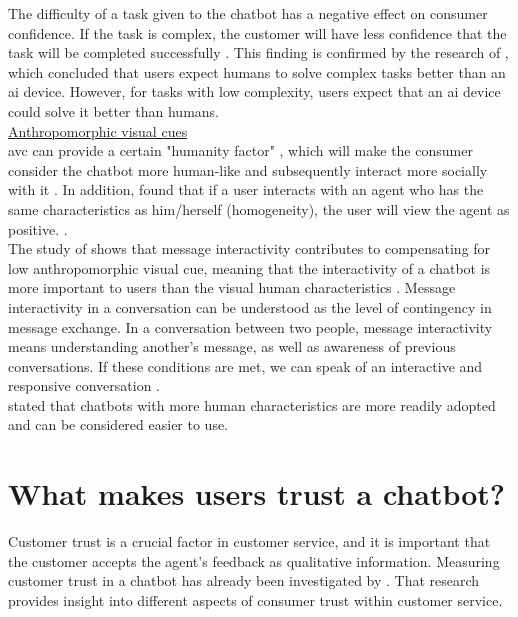 The difficulty of a task given to the chatbot has a negative effect on consumer confidence. If the task is complex, the customer will have less confidence that the task will be completed successfully \citep{Cheng2021}.
This finding is confirmed by the research of \citeauthor{XU2020}, which concluded that users expect humans to solve complex tasks better than an \acrshort{ai} device. However, for tasks with low complexity, users expect that an \acrshort{ai} device could solve it better than humans. \citep{XU2020}\\
\break
\ul{Anthropomorphic visual cues}\\
\gls{avc} can provide a certain "humanity factor" \citep{Shyam2008}, which will make the consumer consider the chatbot more human-like and subsequently interact more socially with it \citep{Go2019,Gong2007,Kim2012, Nowak2004}.
In addition, \citeauthor{Go2019,Koda1996,Wexelblat1998} found that if a user interacts with an agent who has the same characteristics as him/herself (homogeneity), the user will view the agent as positive. \citep{Go2019,Koda1996,Wexelblat1998}.\\
\break
The study of \citeauthor{Go2019} shows that message interactivity contributes to compensating for low anthropomorphic visual cue, meaning that the interactivity of a chatbot is more important to users than the visual human characteristics \citep{Go2019}. Message interactivity in a conversation can be understood as the level of contingency in message exchange. In a conversation between two people, message interactivity means understanding another's message, as well as awareness of previous conversations. If these conditions are met, we can speak of an interactive and responsive conversation \citep{Go2019,Sudweeks1998}.\\
\citeauthor{Sheehan2020} stated that chatbots with more human characteristics are more readily adopted and can be considered easier to use. \citep{Sheehan2020}

\section{What makes users trust a chatbot?}
Customer trust is a crucial factor in customer service, and it is important that the customer accepts the agent's feedback as qualitative information. Measuring customer trust in a chatbot has already been investigated by \citeauthor{Folstad2018}. That research provides insight into different aspects of consumer trust within customer service.

